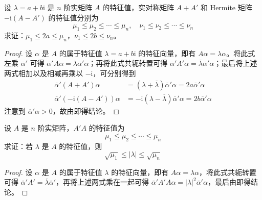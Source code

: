 \documentclass[../../main.tex]{subfiles}
\begin{document}
\begin{example}\label{example:例9.54}
设 \(\lambda = a + b\mathrm{i}\) 是 \(n\) 阶实矩阵 \(A\) 的特征值，实对称矩阵 \(A + A'\) 和 Hermite 矩阵 \(-\mathrm{i}(A - A')\) 的特征值分别为
\[
\mu_1 \leq \mu_2 \leq \cdots \leq \mu_n,\quad \nu_1 \leq \nu_2 \leq \cdots \leq \nu_n
\]
求证：\(\mu_1 \leq 2a \leq \mu_n\)，\(\nu_1 \leq 2b \leq \nu_n\)。
\end{example}
\begin{proof}
设 \(\alpha\) 是 \(A\) 的属于特征值 \(\lambda = a + b\mathrm{i}\) 的特征向量，即有 \(A\alpha = \lambda\alpha\)。将此式左乘 \(\overline{\alpha}'\) 可得 \(\overline{\alpha}'A\alpha = \lambda\overline{\alpha}'\alpha\)；再将此式共轭转置可得 \(\overline{\alpha}'A'\alpha = \overline{\lambda}\overline{\alpha}'\alpha\)；最后将上述两式相加以及相减再乘以 \(-\mathrm{i}\)，可分别得到
\begin{align*}
\overline{\alpha}'(A + A')\alpha &= (\lambda + \overline{\lambda})\overline{\alpha}'\alpha = 2a\overline{\alpha}'\alpha\\
\overline{\alpha}'(-\mathrm{i}(A - A'))\alpha &= -\mathrm{i}(\lambda - \overline{\lambda})\overline{\alpha}'\alpha = 2b\overline{\alpha}'\alpha
\end{align*}
注意到 \(\overline{\alpha}'\alpha > 0\)，故由即得结论。 
\end{proof}

\begin{example}\label{example:例9.55}
设 \(A\) 是 \(n\) 阶实矩阵，\(A'A\) 的特征值为
\[
\mu_1 \leq \mu_2 \leq \cdots \leq \mu_n
\]
求证：若 \(\lambda\) 是 \(A\) 的特征值，则
\[
\sqrt{\mu_1} \leq |\lambda| \leq \sqrt{\mu_n}
\]
\end{example}
\begin{proof}
设 \(\alpha\) 是 \(A\) 的属于特征值 \(\lambda\) 的特征向量，即有 \(A\alpha = \lambda\alpha\)，将此式共轭转置可得 \(\overline{\alpha}'A' = \overline{\lambda}\overline{\alpha}'\)，再将上述两式乘在一起可得 \(\overline{\alpha}'A'A\alpha = |\lambda|^2\overline{\alpha}'\alpha\)，最后由即得结论。 
\end{proof}
\end{document}
